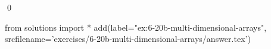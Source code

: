 
\begin{ex} 
  \label{ex:6-20b-multi-dimensional-arrays}
  
  \qed
\end{ex} 
\begin{python0}
from solutions import *
add(label="ex:6-20b-multi-dimensional-arrays",
    srcfilename='exercises/6-20b-multi-dimensional-arrays/answer.tex') 
\end{python0}
